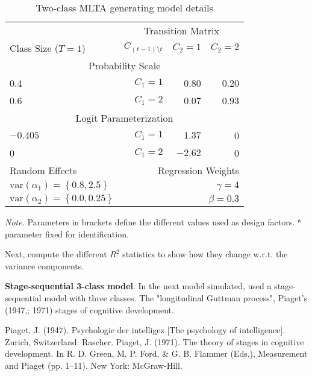 \documentclass[man, noextraspace, floatsintext, 12pt]{apa7}
\begin{document}
\begin{table}[!htp]
\centering
\begin{threeparttable}
\caption{Two-class MLTA generating model details}
\label{tb:model-1}
\begin{tabular}{l r c r r r }
\toprule
& & & \multicolumn{3}{c}{Transition Matrix}\\ \cmidrule(lr){4-6}
\multicolumn{2}{l}{Class Size ($T=1$)} & & $C_{(t-1)\setminus t}$ & $C_2 =1$ & $C_2 =2$   \\ \midrule
\multicolumn{6}{c}{Probability Scale}\\
0.4	&  & &  $C_1 =1$	& 0.80  & 0.20  \\
0.6	&  & &  $C_1 =2$	& 0.07  & 0.93 \\
\multicolumn{6}{c}{Logit Parameterization}\\
$-0.405$	&  & & $C_1 =1$	& $1.37$    & 0\tnote{a}\\
0\tnote{a}	&  & & $C_1 =2$	& $-2.62$  & 0\tnote{a} \\ \midrule
\multicolumn{3}{l}{Random Effects} & \multicolumn{3}{r}{Regression Weights}\\ 
\multicolumn{3}{l}{$\mathrm{var}(\alpha_1) = \left\lbrace 0.8, 2.5\right\rbrace$} & \multicolumn{3}{r}{$\gamma = 4$}\\ 
\multicolumn{3}{l}{$\mathrm{var}(\alpha_2) = \left\lbrace 0.0, 0.25\right\rbrace$} & \multicolumn{3}{r}{$\beta = 0.3$}\\
 \bottomrule
\end{tabular}
 \vspace*{1mm}
 	\begin{tablenotes}
    {\small
        \textit{Note.} Parameters in brackets define the different values used as design factors. $\rm ^{a}$parameter fixed for identification.
    }
 	\end{tablenotes}
 \end{threeparttable}
\end{table}


Next, compute the different $R^2$ statistics to show how they change w.r.t. the variance components.

\textbf{Stage-sequential 3-class model}.
In the next model simulated, used a stage-sequential model with three classes.
The
"longitudinal Guttman  process", Piaget's (1947,; 1971) stages of cognitive development.

Piaget, J. (1947). Psychologie der intelligez [The psychology of intelligence]. Zurich, Switzerland: Rascher.
Piaget, J. (1971). The theory of stages in cognitive development. In R. D. Green, M. P. Ford, \& G. B. Flammer (Eds.), Measurement and Piaget (pp. 1–11). New York: McGraw-Hill.
\end{document}
